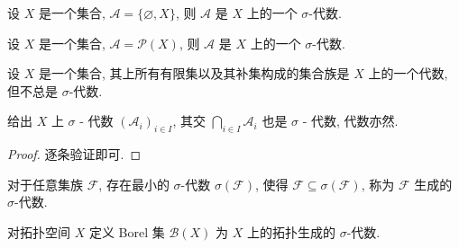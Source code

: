 \begin{example}
    设 \(X\) 是一个集合, \(\mathcal{A} = \{\varnothing, X\}\), 则 \(\mathcal{A}\) 是 \(X\) 上的一个 \(\sigma\)-代数.

    设 \(X\) 是一个集合, \(\mathcal{A} = \mathcal{P} (X)\), 则 \(\mathcal{A}\) 是 \(X\) 上的一个 \(\sigma\)-代数.

    设 \(X\) 是一个集合, 其上所有有限集以及其补集构成的集合族是 \(X\) 上的一个代数, 但不总是 \(\sigma\)-代数.
\end{example}

\begin{lemma}
    给出 \(X\) 上 \(\sigma\) - 代数 \({(\mathcal{A}_i)}_{i \in I}\), 其交 \(\bigcap_{i \in I} \mathcal{A}_i\) 也是 \(\sigma\) - 代数,
    代数亦然.

    \begin{proof}
        逐条验证即可.
    \end{proof}
\end{lemma}

\begin{corollary}
    对于任意集族 \(\mathcal{F}\), 存在最小的 \(\sigma\)-代数 \(\sigma(\mathcal{F})\), 使得 \(\mathcal{F} \subseteq \sigma(\mathcal{F})\),
    称为 \(\mathcal{F}\) 生成的 \(\sigma\)-代数.
\end{corollary}

\begin{definition}[Borel 集]
    \label {definition:Borel set}
    对拓扑空间 \(X\) 定义 Borel 集 \(\mathcal{B}(X)\) 为 \(X\) 上的拓扑生成的 \(\sigma\)-代数.
\end{definition}

